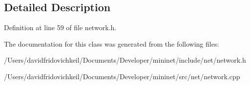 \subsection{Detailed Description}


Definition at line 59 of file network.\+h.



The documentation for this class was generated from the following files\+:\begin{DoxyCompactItemize}
\item 
/\+Users/davidfridovichkeil/\+Documents/\+Developer/mininet/include/net/network.\+h\item 
/\+Users/davidfridovichkeil/\+Documents/\+Developer/mininet/src/net/network.\+cpp\end{DoxyCompactItemize}
